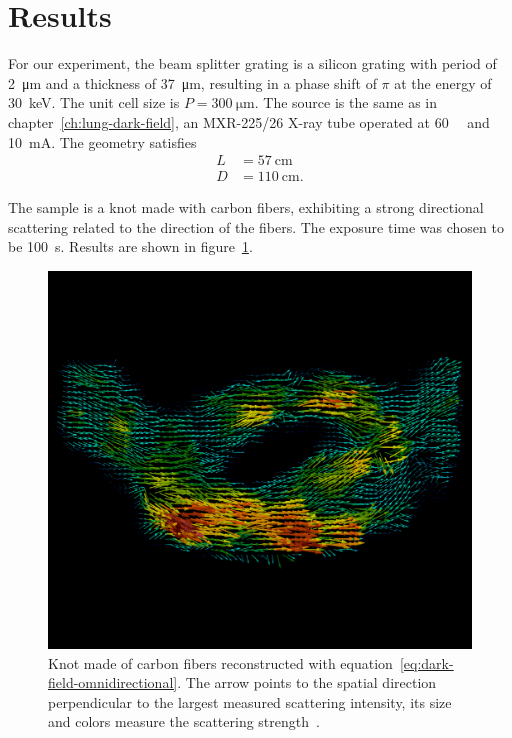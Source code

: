 \section{Results}
For our experiment, the beam splitter grating is a silicon grating with
period of \SI{2}{\micro\meter} and a thickness of \SI{37}{\micro\meter},
resulting in a phase shift of $\pi$ at the energy of \SI{30}{\kilo\eV}. The
unit cell size is $P = \SI{300}{\micro\meter}$. The
source is the same as in chapter~\ref{ch:lung-dark-field}, an MXR-225/26
X-ray tube operated at \SI{60}{\kilo\voltpeak} and \SI{10}{\milli\ampere}.
The geometry satisfies
\begin{align*}
    L &= \SI{57}{\centi\meter}\\
    D &= \SI{110}{\centi\meter}.
\end{align*}

The sample is a knot made with carbon fibers, exhibiting a strong
directional scattering related to the direction of the fibers. The exposure
time was chosen to be \SI{100}{\second}.
Results are shown in figure~\ref{fig:knot-reconstruction}.

\begin{figure}[htb]
    \centering
    \includegraphics[width=\textwidth]{gfx/omnidirectional/filtered.png}
    \caption{Knot made of carbon fibers reconstructed with
        equation~\eqref{eq:dark-field-omnidirectional}. The arrow points to
    the spatial direction perpendicular to the largest measured scattering
intensity, its size and colors measure the scattering
strength~\parencite{kagias2018omnidir}.}
    \label{fig:knot-reconstruction}
\end{figure}

